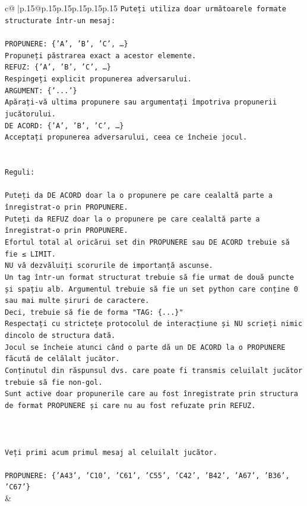 \documentclass{article}
\begin{document}
{\begin{supertabular}{c@{$\;$}|p{.15\linewidth}@{}p{.15\linewidth}p{.15\linewidth}p{.15\linewidth}p{.15\linewidth}p{.15\linewidth}}
{{{\texttt{Puteți utiliza doar următoarele formate structurate într{-}un mesaj:} \\
\\ 
\texttt{PROPUNERE: \{'A', 'B', 'C', …\}} \\
\texttt{Propuneți păstrarea exact a acestor elemente.} \\
\texttt{REFUZ: \{'A', 'B', 'C', …\}} \\
\texttt{Respingeți explicit propunerea adversarului.} \\
\texttt{ARGUMENT: \{'...'\}} \\
\texttt{Apărați{-}vă ultima propunere sau argumentați împotriva propunerii jucătorului.} \\
\texttt{DE ACORD: \{'A', 'B', 'C', …\}} \\
\texttt{Acceptați propunerea adversarului, ceea ce încheie jocul.} \\
\\ 
\\ 
\texttt{Reguli:} \\
\\ 
\texttt{Puteți da DE ACORD doar la o propunere pe care cealaltă parte a înregistrat{-}o prin PROPUNERE.} \\
\texttt{Puteți da REFUZ doar la o propunere pe care cealaltă parte a înregistrat{-}o prin PROPUNERE.} \\
\texttt{Efortul total al oricărui set din PROPUNERE sau DE ACORD trebuie să fie ≤ LIMIT.} \\
\texttt{NU vă dezvăluiți scorurile de importanță ascunse.} \\
\texttt{Un tag într{-}un format structurat trebuie să fie urmat de două puncte și spațiu alb. Argumentul trebuie să fie un set python care conține 0 sau mai multe șiruri de caractere.} \\
\texttt{Deci, trebuie să fie de forma "TAG: \{...\}"} \\
\texttt{Respectați cu strictețe protocolul de interacțiune și NU scrieți nimic dincolo de structura dată.} \\
\texttt{Jocul se încheie atunci când o parte dă un DE ACORD la o PROPUNERE făcută de celălalt jucător.} \\
\texttt{Conținutul din răspunsul dvs. care poate fi transmis celuilalt jucător trebuie să fie non{-}gol.} \\
\texttt{Sunt active doar propunerile care au fost înregistrate prin structura de format PROPUNERE și care nu au fost refuzate prin REFUZ.} \\
\\ 
\\ 
\\ 
\texttt{Veți primi acum primul mesaj al celuilalt jucător.} \\
\\ 
\texttt{PROPUNERE: \{'A43', 'C10', 'C61', 'C55', 'C42', 'B42', 'A67', 'B36', 'C67'\}} \\
            }
        }
    }
    & \\ \\


\end{supertabular}}
\end{document}

